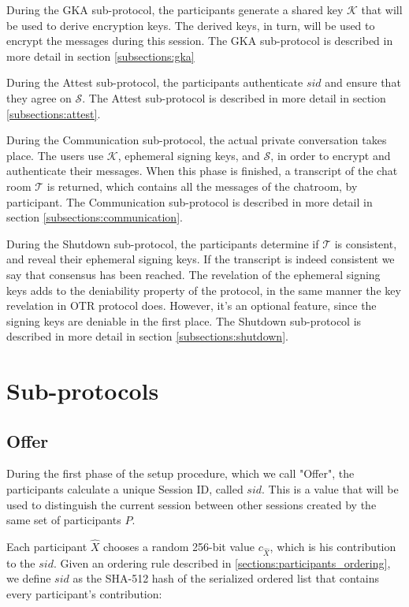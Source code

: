 During the GKA sub-protocol, the participants generate a shared key $\mathcal{K}$ that will be used to derive encryption keys. The derived keys, in turn, will be used to encrypt the messages during this session. The GKA sub-protocol is described in more detail in section \ref{subsections:gka}

During the Attest sub-protocol, the participants authenticate $sid$ and ensure that they agree on $\mathcal{S}$. The Attest sub-protocol is described in more detail in section \ref{subsections:attest}. 

During the Communication sub-protocol, the actual private conversation takes place. The users use $\mathcal{K}$, ephemeral signing keys, and $\mathcal{S}$, in order to encrypt and authenticate their messages. When this phase is finished, a transcript of the chat room $\mathcal{T}$ is returned, which contains all the messages of the chatroom, by participant. The Communication sub-protocol is described in more detail in section \ref{subsections:communication}. 

During the Shutdown sub-protocol, the participants determine if $\mathcal{T}$ is consistent, and reveal their ephemeral signing keys. If the transcript is indeed consistent we say that consensus has been reached. The revelation of the ephemeral signing keys adds to the deniability property of the protocol, in the same manner the key revelation in OTR protocol does. However, it’s an optional feature, since the signing keys are deniable in the first place. The Shutdown sub-protocol is described in more detail in section \ref{subsections:shutdown}. 


\section{Sub-protocols}

\subsection{Offer}
\label{subsections:offer}
During the first phase of the setup procedure, which we call "Offer", the participants calculate a unique Session ID, called $sid$. This is a value that will be used to distinguish the current session between other sessions created by the same set of participants $P$.

Each participant $\hat{X}$ chooses a random 256-bit value $c_{\hat{X}}$, which is his contribution to the $sid$. Given an ordering rule described in \ref{sections:participants_ordering}, we define $sid$ as the SHA-512 hash of the serialized ordered list that contains every participant's contribution:

